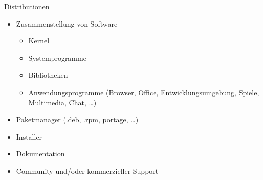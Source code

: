 \documentclass{beamer}
\begin{document}
\begin{frame}{Distributionen}
    \begin{itemize}
        \item Zusammenstellung von Software
            \begin{itemize}
                \item Kernel
                \item Systemprogramme
                \item Bibliotheken
                \item Anwendungsprogramme (Browser, Office,
                    Entwicklungsumgebung, Spiele, Multimedia, Chat, …)
            \end{itemize}
        \pause
        \item Paketmanager (.deb, .rpm, portage, …)
        \pause
        \item Installer
        \item Dokumentation
        \item Community und/oder kommerzieller Support
    \end{itemize}
\end{frame}
\end{document}
